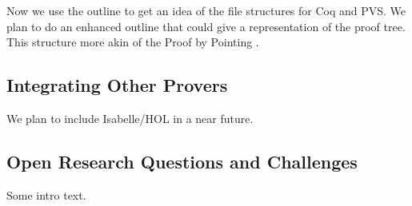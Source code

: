 \documentclass{entcs}
\begin{document}
Now we use the outline to get an idea of the file structures for Coq and PVS.
We plan to do an enhanced outline that could give a representation
of the proof tree. This structure more akin of the Proof by Pointing
\cite{bertot94proof}.


\subsection{Integrating Other Provers}
\label{subsec:integr-other-prov}

We plan to include Isabelle/HOL in a near future.

\subsection{Open Research Questions and Challenges}
\label{subsec:open-rese-quest}

Some intro text.



%


\end{document}
